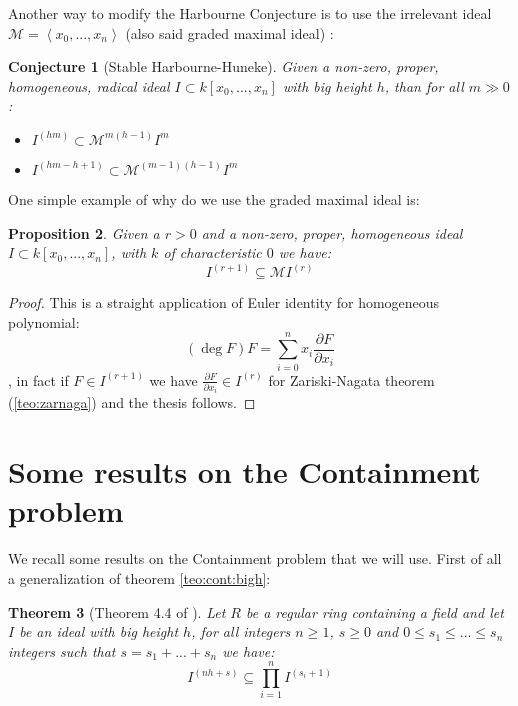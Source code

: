 \documentclass[notitlepage, a4]{book}
\theoremstyle{plain}
\newtheorem{teo}{Theorem}[section]
\newtheorem{prop}[teo]{Proposition}
\newtheorem{conj}[teo]{Conjecture}
\theoremstyle{remark}
\theoremstyle{definition}
\newcommand{\parder}[2]{ \frac{\partial #1}{\partial #2} }
\newcommand{\MM}{\mathcal{M}}
\begin{document}
	Another way to modify the Harbourne Conjecture is to use the irrelevant ideal $ \MM=\left\langle x_0 , ... ,x_n \right> $ (also said graded maximal ideal) : 
	
	\begin{conj}[Stable Harbourne-Huneke]\label{conj:stabharbhun}
	Given a non-zero, proper, homogeneous, radical ideal $ I \subset k[x_0 , ... , x_n] $ with big height $ h $, than for all $ m \gg 0 $:
	\begin{itemize}
	\item $ I^{(hm)} \subset \MM^{m(h-1)} I^m$
	\item $ I^{(hm - h +1 )} \subset \MM^{(m-1)(h-1)} I^m $
	\end{itemize}
	\end{conj}
	
	One simple example of why do we use the graded maximal ideal is:
	
	\begin{prop} \label{prop:eulid}
	Given a $ r>0 $ and a non-zero, proper, homogeneous ideal $ I \subset k[x_0 , ... , x_n] $, with $ k $ of characteristic $ 0 $ we have:
	\[ I^{(r+1)}   \subseteq \MM I^{(r)}\]
	\end{prop}
	\begin{proof}
	This is a straight application of Euler identity for homogeneous polynomial:
	\[ (\deg{F})F = \sum_{i=0}^{n} x_i \parder{F}{x_i} \]
	, in fact if $ F \in I^{(r+1)} $ we have $ \parder{F}{x_i} \in I^{(r)} $ for Zariski-Nagata theorem (\ref{teo:zarnaga}) and the thesis follows.
 	\end{proof}
 	

\section{Some results on the Containment problem}

We recall some results on the Containment problem that we will use. First of all a generalization of theorem \ref{teo:cont:bigh}:

\begin{teo}[Theorem 4.4 of \cite{John14}]\label{teo:cont:bighgen}
Let $ R $ be a regular ring containing a field and let $ I $ be an ideal with big height $ h $, for all integers $ n \geq 1 $, $ s \geq 0 $ and $ 0 \leq s_1 \leq  ... \leq s_n $ integers such that $ s = s_1 +  ... + s_n $ we have:
\begin{equation}\label{eq:cont:bighgen}
	I^{(nh + s)} \subseteq \prod_{i=1}^{n} I^{(s_i + 1)}
\end{equation}
\end{teo}
\end{document}
